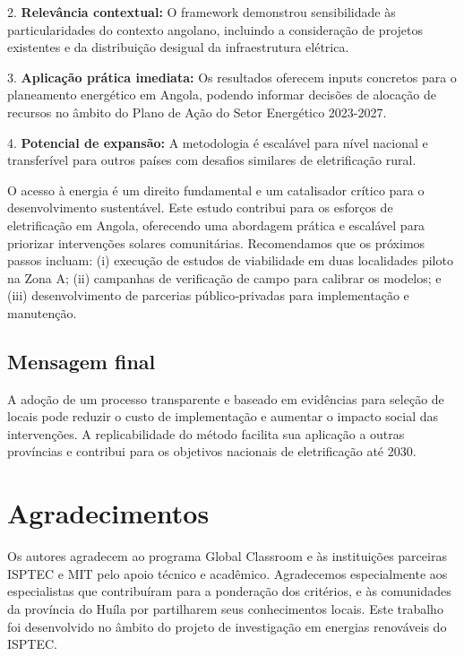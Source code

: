 \documentclass[12pt, a4paper]{article}
\begin{document}
2. \textbf{Relevância contextual:} O framework demonstrou sensibilidade às particularidades do contexto angolano, incluindo a consideração de projetos existentes e da distribuição desigual da infraestrutura elétrica.

3. \textbf{Aplicação prática imediata:} Os resultados oferecem inputs concretos para o planeamento energético em Angola, podendo informar decisões de alocação de recursos no âmbito do Plano de Ação do Setor Energético 2023-2027.

4. \textbf{Potencial de expansão:} A metodologia é escalável para nível nacional e transferível para outros países com desafios similares de eletrificação rural.

O acesso à energia é um direito fundamental e um catalisador crítico para o desenvolvimento sustentável. Este estudo contribui para os esforços de eletrificação em Angola, oferecendo uma abordagem prática e escalável para priorizar intervenções solares comunitárias. Recomendamos que os próximos passos incluam: (i) execução de estudos de viabilidade em duas localidades piloto na Zona A; (ii) campanhas de verificação de campo para calibrar os modelos; e (iii) desenvolvimento de parcerias público‑privadas para implementação e manutenção.

\subsection{Mensagem final}

A adoção de um processo transparente e baseado em evidências para seleção de locais pode reduzir o custo de implementação e aumentar o impacto social das intervenções. A replicabilidade do método facilita sua aplicação a outras províncias e contribui para os objetivos nacionais de eletrificação até 2030.

\section*{Agradecimentos}

Os autores agradecem ao programa Global Classroom e às instituições parceiras ISPTEC e MIT pelo apoio técnico e acadêmico. Agradecemos especialmente aos especialistas que contribuíram para a ponderação dos critérios, e às comunidades da província do Huíla por partilharem seus conhecimentos locais. Este trabalho foi desenvolvido no âmbito do projeto de investigação em energias renováveis do ISPTEC.



\end{document}
